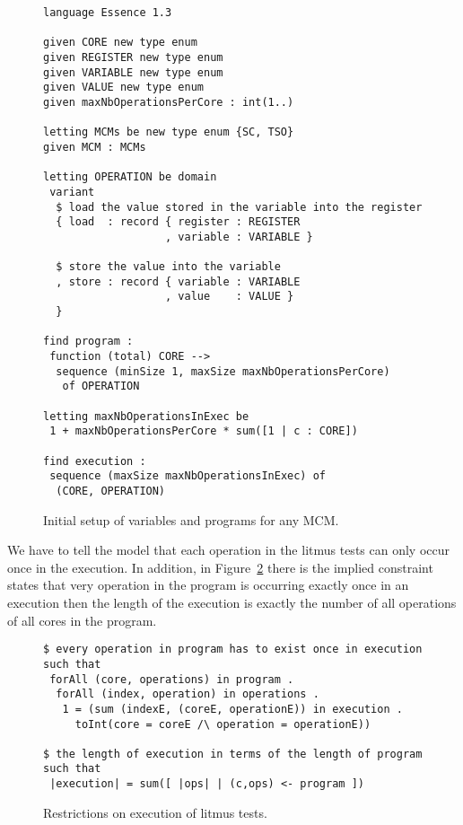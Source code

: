 \documentclass[runningheads]{llncs}
\begin{document}
\begin{figure}
\begin{lstlisting}
language Essence 1.3

given CORE new type enum
given REGISTER new type enum
given VARIABLE new type enum
given VALUE new type enum
given maxNbOperationsPerCore : int(1..)

letting MCMs be new type enum {SC, TSO}
given MCM : MCMs

letting OPERATION be domain
 variant
  $ load the value stored in the variable into the register
  { load  : record { register : REGISTER
                   , variable : VARIABLE }

  $ store the value into the variable
  , store : record { variable : VARIABLE
                   , value    : VALUE }
  }

find program :
 function (total) CORE -->
  sequence (minSize 1, maxSize maxNbOperationsPerCore)
   of OPERATION

letting maxNbOperationsInExec be
 1 + maxNbOperationsPerCore * sum([1 | c : CORE])

find execution :
 sequence (maxSize maxNbOperationsInExec) of
  (CORE, OPERATION)
\end{lstlisting}
\caption{Initial setup of variables and programs for any MCM.\label{fig:essence1}}
\end{figure}


We have to tell the model that each operation in the litmus tests can only occur once in the execution.
In addition, in Figure~\ref{fig:essence2} there is the implied constraint states that very operation in the program is occurring exactly once in an execution then the length of the execution is exactly the number of all operations of all cores in the program.

\begin{figure}
\begin{lstlisting}
$ every operation in program has to exist once in execution
such that
 forAll (core, operations) in program .
  forAll (index, operation) in operations .
   1 = (sum (indexE, (coreE, operationE)) in execution .
     toInt(core = coreE /\ operation = operationE))

$ the length of execution in terms of the length of program
such that
 |execution| = sum([ |ops| | (c,ops) <- program ])
\end{lstlisting}
\caption{Restrictions on execution of litmus tests.\label{fig:essence2}}
\end{figure}
\end{document}
